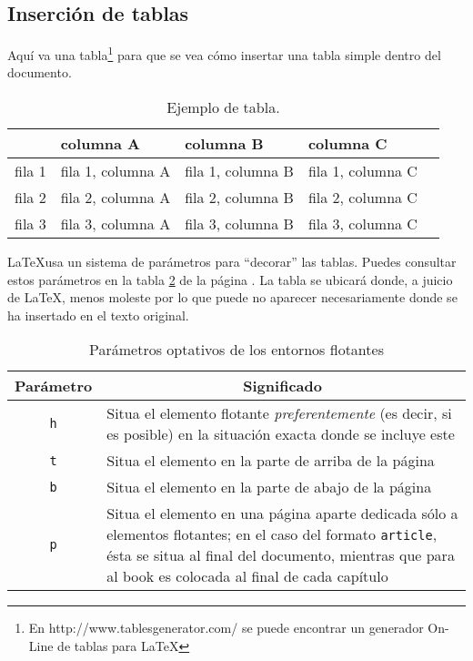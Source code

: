 \subsection{Inserción de tablas}

Aquí va una tabla\footnote{En http://www.tablesgenerator.com/ se puede encontrar un generador On-Line de tablas para \LaTeX} para que se vea cómo insertar una tabla simple dentro del documento.

\begin{table}[h]
\begin{center}
\begin{tabular}{lllll}
&columna A&columna B&columna C\\
\hline
fila 1&fila 1, columna A & fila 1, columna B & fila 1, columna C\\
fila 2&fila 2, columna A & fila 2, columna B & fila 2, columna C\\
fila 3&fila 3, columna A & fila 3, columna B & fila 3, columna C\\ \hline
\end{tabular}
\end{center}
\caption{Ejemplo de tabla.}
\label{tabladeejemplo}
\end{table}

\LaTeX usa un sistema de parámetros para ``decorar'' las tablas. Puedes consultar estos parámetros en la tabla \ref{tabla_parametros} de la página \pageref{tabla_parametros}. La tabla se ubicará donde, a juicio de \LaTeX, menos moleste por lo que puede no aparecer necesariamente donde se ha insertado en el texto original. 

\begin{table}
\begin{center}
\begin{tabular}{|c|p{}|}
\hline
Parámetro & \multicolumn{1}{c|}{Significado} \\ \hline
\texttt{h} & Situa el elemento flotante \emph{preferentemente}
(es decir, si es posible) en la situación exacta donde se incluye este \\
\texttt{t} & Situa el elemento en la parte de arriba de la página \\
\texttt{b} & Situa el elemento en la parte de abajo de la página \\
\texttt{p} & Situa el elemento en una página aparte dedicada sólo a
elementos flotantes; en el caso del formato \texttt{article},
ésta se situa al final del documento, mientras que para al book es
colocada al final de cada capítulo \\ \hline
\end{tabular}
\end{center}
\caption{Parámetros optativos de los entornos flotantes}
\label{tabla_parametros}
\end{table}



